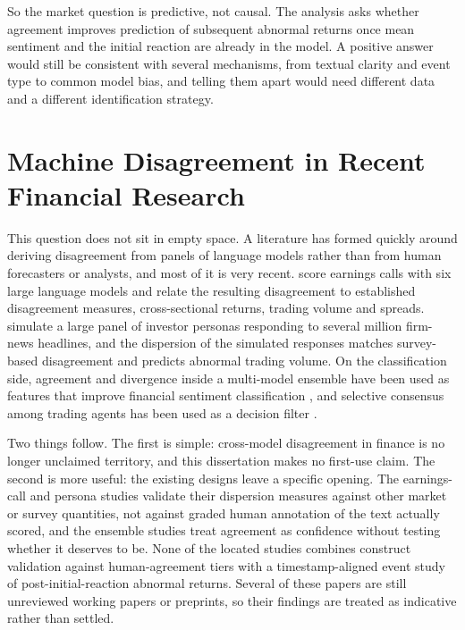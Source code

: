 \documentclass[11pt,a4paper,oneside]{book}
\let\Textcite\Citet
\let\parencite\citep
\begin{document}
So the market question is predictive, not causal.
The analysis asks whether agreement improves prediction of subsequent abnormal returns once mean sentiment and the initial reaction are already in the model.
A positive answer would still be consistent with several mechanisms, from textual clarity and event type to common model bias, and telling them apart would need different data and a different identification strategy.

\section{Machine Disagreement in Recent Financial Research}
\label{sec:lit-machine-disagreement}

This question does not sit in empty space.
A literature has formed quickly around deriving disagreement from panels of language models rather than from human forecasters or analysts, and most of it is very recent.
\Textcite{liu2025disagreement} score earnings calls with six large language models and relate the resulting disagreement to established disagreement measures, cross-sectional returns, trading volume and spreads.
\Textcite{bhagwat2026mirror} simulate a large panel of investor personas responding to several million firm-news headlines, and the dispersion of the simulated responses matches survey-based disagreement and predicts abnormal trading volume.
On the classification side, agreement and divergence inside a multi-model ensemble have been used as features that improve financial sentiment classification \parencite{zhang2025finsentllm}, and selective consensus among trading agents has been used as a decision filter \parencite{li2026trusttrade}.

Two things follow.
The first is simple: cross-model disagreement in finance is no longer unclaimed territory, and this dissertation makes no first-use claim.
The second is more useful: the existing designs leave a specific opening.
The earnings-call and persona studies validate their dispersion measures against other market or survey quantities, not against graded human annotation of the text actually scored, and the ensemble studies treat agreement as confidence without testing whether it deserves to be.
None of the located studies combines construct validation against human-agreement tiers with a timestamp-aligned event study of post-initial-reaction abnormal returns.
Several of these papers are still unreviewed working papers or preprints, so their findings are treated as indicative rather than settled.
\end{document}
